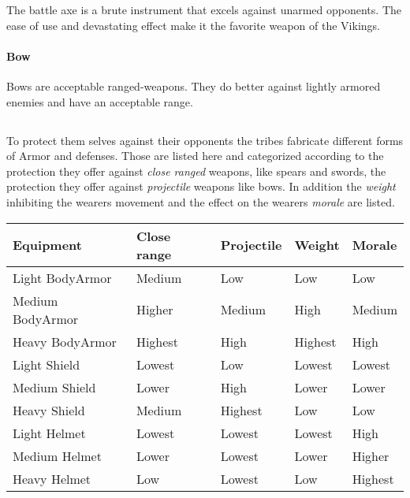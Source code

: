 The battle axe is a brute instrument that excels against unarmed opponents. The
ease of use and devastating effect make it the favorite weapon of the
\gls{Vikings}.

\paragraph{Bow}

Bows are acceptable ranged-weapons. They do better against lightly armored
enemies and have an acceptable range.

\subsection{}\label{ch:Goods:Armory:Armor}

To protect them selves against their opponents the tribes fabricate different
forms of \gls{Armor} and defenses. Those are listed here and categorized
according to the protection they offer against \emph{close ranged} weapons,
like spears and swords, the protection they offer against \emph{projectile}
weapons like bows. In addition the \emph{weight} inhibiting the wearers
movement and the effect on the wearers \emph{morale} are listed.

\begin{longtable}{lllll}
	\toprule
	Equipment
	 & Close range & Projectile & Weight  & Morale  \\
	\midrule
	Light \gls{BodyArmor}
	 & Medium      & Low        & Low     & Low     \\
	Medium \gls{BodyArmor}
	 & Higher      & Medium     & High    & Medium  \\
	Heavy \gls{BodyArmor}
	 & Highest     & High       & Highest & High    \\
	\midrule
	Light \gls{Shield}
	 & Lowest      & Low        & Lowest  & Lowest  \\
	Medium \gls{Shield}
	 & Lower       & High       & Lower   & Lower   \\
	Heavy \gls{Shield}
	 & Medium      & Highest    & Low     & Low     \\
	\midrule
	Light \gls{Helmet}
	 & Lowest      & Lowest     & Lowest  & High    \\
	Medium \gls{Helmet}
	 & Lower       & Lowest     & Lower   & Higher  \\
	Heavy \gls{Helmet}
	 & Low         & Lowest     & Low     & Highest \\
	\bottomrule
\end{longtable}

